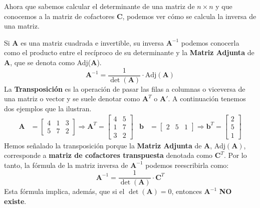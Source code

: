 \documentclass[12pt]{article}
\begin{document}
Ahora que sabemos calcular el determinante de una matriz de $n \times n$ y que conocemos a la matriz de cofactores $\mathbf{C}$, podemos ver cómo se calcula la inversa de una matriz.

Si $\mathbf{A}$ es una matriz cuadrada e invertible, su inversa $\mathbf{A}^{-1}$ podemos conocerla como el producto entre el recíproco de su determinante y la \textbf{Matriz Adjunta} de $\mathbf{A}$, que se denota como Adj($\mathbf{A}$).
\[
  \mathbf{A}^{-1} = \frac{1}{\det(\mathbf{A})} \cdot \text{Adj}(\mathbf{A})
\]
La \textbf{Transposición} es la operación de pasar las filas a columnas o viceversa de una matriz o vector y se suele denotar como $\mathbf{A}^{T}$ o $\mathbf{A'}$. A continuación tenemos dos ejemplos que la ilustran.
\begin{align*}
\mathbf{A} &=
\begin{bmatrix}
4 & 1 & 3 \\
5 & 7 & 2
\end{bmatrix}
\Rightarrow
\mathbf{A}^{T} =
\begin{bmatrix}
4 & 5 \\
1 & 7 \\
3 & 2
\end{bmatrix} &
\mathbf{b} &=
\begin{bmatrix}
2 & 5 & 1
\end{bmatrix}
\Rightarrow
\mathbf{b}^{T} =
\begin{bmatrix}
2 \\ 5 \\ 1
\end{bmatrix}
\end{align*}
Hemos señalado la transposición porque la \textbf{Matriz Adjunta} de $\mathbf{A}$, Adj$(\mathbf{A})$, corresponde a \textbf{matriz de cofactores transpuesta} denotada como $\mathbf{C}^{T}$. Por lo tanto, la fórmula de la matriz inversa de $\mathbf{A}^{-1}$ podemos reescribirla como:
\[
  \mathbf{A}^{-1} = \frac{1}{\det(\mathbf{A})} \cdot \mathbf{C}^{T}
\]
Esta fórmula implica, además, que si el $\det(\mathbf{A}) = 0$, entonces $\mathbf{A}^{-1}$ \textbf{NO existe}.
\end{document}

